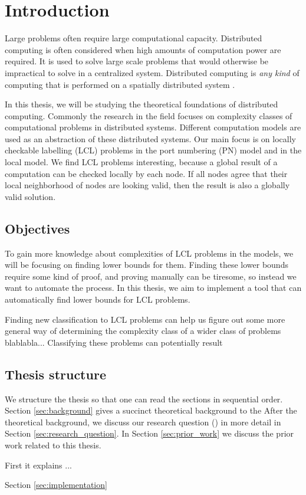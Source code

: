 
\section{Introduction}  \label{sec:introduction}

Large problems often require large computational capacity.
Distributed computing is often considered when high amounts of computation power are required.
It is used to solve large scale problems that would otherwise be impractical to solve in a centralized system.
Distributed computing is \emph{any kind} of computing that is performed on a spatially distributed system
\cite{DBLP:books/el/leeuwen90/LamportL90}.

In this thesis, we will be studying the theoretical foundations of distributed computing.
Commonly the research in the field focuses on complexity classes of computational problems in distributed systems.
Different computation models are used as an abstraction of these distributed systems.
Our main focus is on locally checkable labelling (LCL) problems in the port numbering (PN) model and in the local model.
We find LCL problems interesting, because a global result of a computation can be checked locally by each node.
If all nodes agree that their local neighborhood of nodes are looking valid, then the result is also a globally valid solution.

\subsection{Objectives}
To gain more knowledge about complexities of LCL problems in the models, we will be focusing on finding lower bounds for them.
Finding these lower bounds require some kind of proof, and proving manually can be tiresome, so instead we want to automate the process.
In this thesis, we aim to implement a tool that can automatically find lower bounds for LCL problems.

Finding new classification to LCL problems can help us figure out some more general way of determining the complexity class of a wider class of problems blablabla...
Classifying these problems can potentially result

\subsection{Thesis structure}
We structure the thesis so that one can read the sections in sequential order.
Section \ref{sec:background} gives a succinct theoretical background to the 
After the theoretical background, we discuss our research question () in more detail in Section \ref{sec:research_question}.
In Section \ref{sec:prior_work} we discuss the prior work related to this thesis.


First it explains ... %

Section \ref{sec:implementation}
